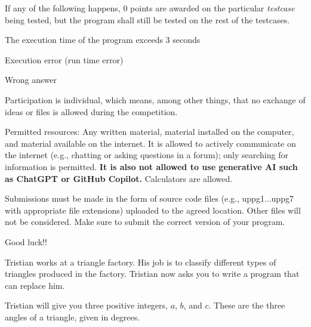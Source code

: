 \begin{lista}
\item If any of the following happens, 0 points are awarded on the particular {\em testcase} being tested,
  but the program shall still be tested on the rest of the testcases.
\begin{lista}
\item The execution time of the program exceeds 3 seconds \vspace{-0.2cm}
\item Execution error (run time error) \vspace{-0.2cm}
\item Wrong answer \vspace{-0.2cm}
\end{lista}

\item Participation is individual, which means, among other things, that no exchange
of ideas or files is allowed during the competition.  
\item Permitted resources: Any written material, material installed on the computer,
and material available on the internet. 
It is  allowed to actively communicate on the internet (e.g., chatting or asking questions in a forum);
only searching for information is permitted.  
{\bf It is also not allowed to use generative AI such as ChatGPT or GitHub Copilot.}  
Calculators are allowed.  
\item Submissions must be made in the form of source code files (e.g., uppg1...uppg7 with appropriate
file extensions) uploaded to the agreed location. Other files will not be considered. Make sure to
submit the correct version of your program.  

\end{lista}

\begin{center}
\Large Good luck!!
\end{center}
%

\newpage
{}

Tristian works at a triangle factory.  
His job is to classify different types of triangles produced in the factory.  
Tristian now asks you to write a program that can replace him.  

Tristian will give you three positive integers, $a$, $b$, and $c$.  
These are the three angles of a triangle, given in degrees.  

